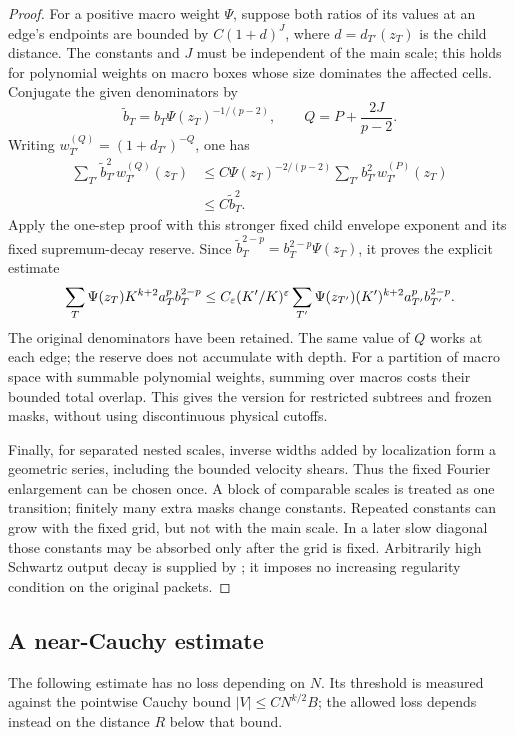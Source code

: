 \begin{proof}
For a positive macro weight $\Psi$, suppose both ratios of its values at
an edge's endpoints are bounded by $C(1+d)^J$, where
$d=d_{T'}(z_T)$ is the child distance.  The constants and $J$ must be
independent of the main scale; this holds for polynomial weights on macro
boxes whose size dominates the affected cells.  Conjugate the given
denominators by
\[
 \widetilde b_T=b_T\Psi(z_T)^{-1/(p-2)},\qquad
 Q=P+\frac{2J}{p-2}.
\]
Writing $w_{T'}^{(Q)}=(1+d_{T'})^{-Q}$, one has
\begin{align*}
 \sum_{T'}\widetilde b_{T'}^2w_{T'}^{(Q)}(z_T)
 &\leq C\Psi(z_T)^{-2/(p-2)}
             \sum_{T'}b_{T'}^2w_{T'}^{(P)}(z_T)\\
 &\leq C\widetilde b_T^2.
\end{align*}
Apply the one-step proof with this stronger fixed child envelope exponent
and its fixed supremum-decay reserve.  Since
$\widetilde b_T^{2-p}=b_T^{2-p}\Psi(z_T)$, it proves the explicit estimate
\[
 \sum_T\Psi(z_T)K^{k+2}a_T^pb_T^{2-p}
 \leq C_\varepsilon(K'/K)^\varepsilon
 \sum_{T'}\Psi(z_{T'})(K')^{k+2}a_{T'}^pb_{T'}^{2-p}.
\]
The original denominators have been retained.  The same value of $Q$ works
at each edge; the reserve does not accumulate with depth.  For a partition
of macro space with summable polynomial weights, summing over macros costs
their bounded total overlap.  This gives the version for restricted subtrees
and frozen masks, without using discontinuous physical cutoffs.

Finally, for separated nested scales, inverse widths added by localization
form a geometric series, including the bounded velocity shears.  Thus the
fixed Fourier enlargement can be chosen once.  A block of comparable scales
is treated as one transition; finitely many extra masks change constants.
Repeated constants can grow with the fixed grid, but not with the main
scale.  In a later slow diagonal those constants may be absorbed only after
the grid is fixed.  Arbitrarily high Schwartz output decay is supplied by
; it imposes no increasing regularity condition on the
original packets.
\end{proof}

\subsection{A near-Cauchy estimate}

The following estimate has no loss depending on $N$.  Its threshold is
measured against the pointwise Cauchy bound $|V|\leq CN^{k/2}B$; the allowed
loss depends instead on the distance $R$ below that bound.

